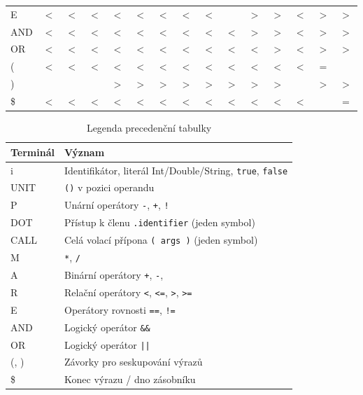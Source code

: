 \documentclass[a4paper,11pt]{article}
\begin{document}
\begin{table}[ht]
\begin{tabular}{>{\ttfamily}l|cccccccccccccc}
    E    & $<$ & $<$ & $<$ & $<$ & $<$ & $<$ & $<$ & $<$ &  & $>$ & $>$ & $<$ & $>$ & $>$ \\
    AND  & $<$ & $<$ & $<$ & $<$ & $<$ & $<$ & $<$ & $<$ & $<$ & $>$ & $>$ & $<$ & $>$ & $>$ \\
    OR   & $<$ & $<$ & $<$ & $<$ & $<$ & $<$ & $<$ & $<$ & $<$ & $<$ & $>$ & $<$ & $>$ & $>$ \\
    (    & $<$ & $<$ & $<$ & $<$ & $<$ & $<$ & $<$ & $<$ & $<$ & $<$ & $<$ & $<$ & $=$ &  \\
    )    &  &  &  & $>$ & $>$ & $>$ & $>$ & $>$ & $>$ & $>$ & $>$ &  & $>$ & $>$ \\
    \$   & $<$ & $<$ & $<$ & $<$ & $<$ & $<$ & $<$ & $<$ & $<$ & $<$ & $<$ & $<$ &  & $=$ \\
    \bottomrule
  \end{tabular}
\end{table}

\begin{table}[ht]
    \caption{Legenda precedenční tabulky}
  \centering
  \small
  \begin{tabular}{>{\ttfamily}l l}
    \toprule
    \textrm{Terminál} & Význam \\
    \midrule
    i          & Identifikátor, literál Int/Double/String, \texttt{true}, \texttt{false} \\
    UNIT       & \texttt{()} v pozici operandu \\
    P          & Unární operátory \texttt{-}, \texttt{+}, \texttt{!} \\
    DOT        & Přístup k členu \texttt{.identifier} (jeden symbol) \\
    CALL       & Celá volací přípona \texttt{( args )} (jeden symbol) \\
    M          & \texttt{*}, \texttt{/} \\
    A          & Binární operátory \texttt{+}, \texttt{-}, \\
    R          & Relační operátory \texttt{<}, \texttt{<=}, \texttt{>}, \texttt{>=} \\
    E          & Operátory rovnosti \texttt{==}, \texttt{!=} \\
    AND        & Logický operátor \texttt{\&\&} \\
    OR         & Logický operátor \texttt{||} \\
    (, )       & Závorky pro seskupování výrazů \\
    \$         & Konec výrazu / dno zásobníku \\
    \bottomrule
  \end{tabular}
\end{table}
 
\end{document}
